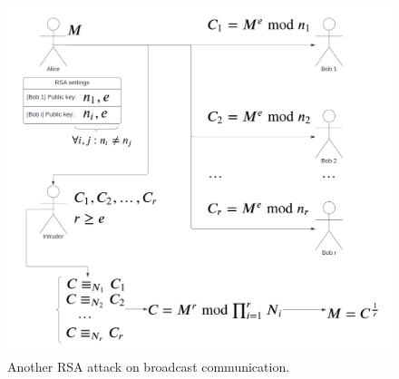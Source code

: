 \begin{figure}[h]
    \centering
    \includegraphics[width=\textwidth]{img/RSA_attack_broadcast.png}
    \caption{Another RSA attack on broadcast communication.}
\end{figure}

